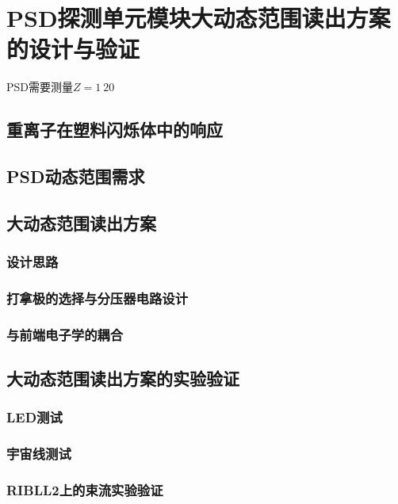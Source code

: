 \chapter{PSD探测单元模块大动态范围读出方案的设计与验证}
PSD需要测量$Z=1~20$
\section{重离子在塑料闪烁体中的响应}

\section{PSD动态范围需求}

\section{大动态范围读出方案}
\subsection{设计思路}
\subsection{打拿极的选择与分压器电路设计}
\subsection{与前端电子学的耦合}

\section{大动态范围读出方案的实验验证}
\subsection{LED测试}
\subsection{宇宙线测试}
\subsection{RIBLL2上的束流实验验证}